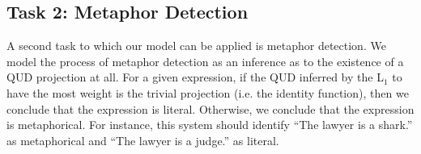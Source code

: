 \documentclass[10pt,letterpaper,twocolumn]{article}
\begin{document}






\subsection{Task 2: Metaphor Detection}

A second task to which our model can be applied is metaphor detection. We model the process of metaphor detection as an inference as to the existence of a QUD projection at all. For a given expression, if the QUD inferred by the L$_1$ to have the most weight is the trivial projection (i.e. the identity function), then we conclude that the expression is literal. Otherwise, we conclude that the expression is metaphorical. For instance, this system should identify ``The lawyer is a shark.'' as metaphorical and ``The lawyer is a judge.'' as literal.
\end{document}

